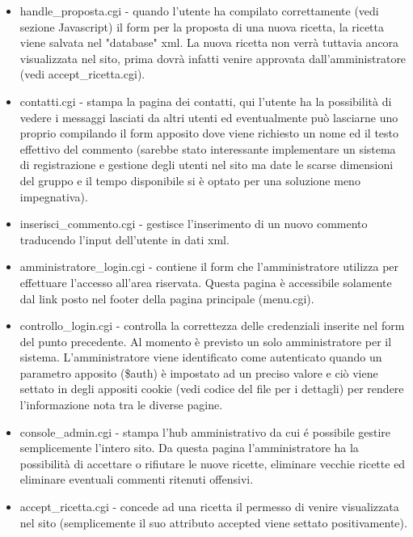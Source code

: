 \documentclass[12pt]{article}
\begin{document}
\begin{itemize}
				\item handle\_proposta.cgi - quando l'utente ha compilato correttamente (vedi sezione Javascript) il form per la proposta di una nuova ricetta, la ricetta viene salvata nel "database" xml. La nuova ricetta non verrà tuttavia ancora visualizzata nel sito, prima dovrà infatti venire approvata dall'amministratore (vedi accept\_ricetta.cgi).

				\item contatti.cgi - stampa la pagina dei contatti, qui l'utente ha la possibilità di vedere i messaggi lasciati da altri utenti ed eventualmente può lasciarne uno proprio compilando il form apposito dove viene richiesto un nome ed il testo effettivo del commento (sarebbe stato interessante implementare un sistema di registrazione e gestione degli utenti nel sito ma date le scarse dimensioni del gruppo e il tempo disponibile si è optato per una soluzione meno impegnativa).

				\item inserisci\_commento.cgi - gestisce l'inserimento di un nuovo commento traducendo l'input dell'utente in dati xml.

				\item amministratore\_login.cgi - contiene il form che l'amministratore utilizza per effettuare l'accesso all'area riservata. Questa pagina è accessibile solamente dal link posto nel footer della pagina principale (menu.cgi).

				\item controllo\_login.cgi - controlla la correttezza delle credenziali inserite nel form del punto precedente. Al momento è previsto un solo amministratore per il sistema. L'amministratore viene identificato come autenticato quando un parametro apposito (\$auth) è impostato ad un preciso valore e ciò viene settato in degli appositi cookie (vedi codice del file per i dettagli) per rendere l'informazione nota tra le diverse pagine.

				\item console\_admin.cgi - stampa l'hub amministrativo da cui \'e possibile gestire semplicemente l'intero sito. Da questa pagina l'amministratore ha la possibilità di accettare o rifiutare le nuove ricette, eliminare vecchie ricette ed eliminare eventuali commenti ritenuti offensivi.

				\item accept\_ricetta.cgi - concede ad una ricetta il permesso di venire visualizzata nel sito (semplicemente il suo attributo accepted viene settato positivamente).


\end{itemize}
\end{document}
